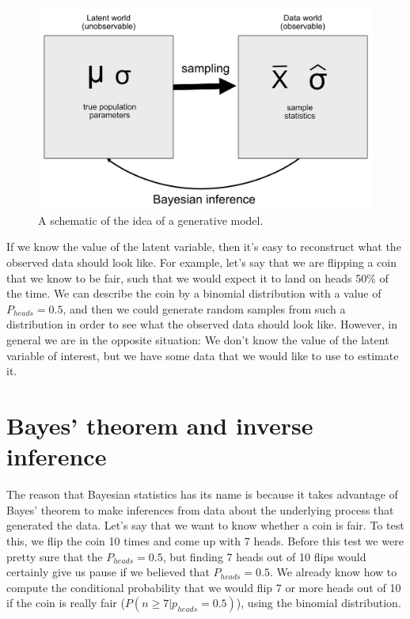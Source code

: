 \documentclass[
  12pt,
]{book}
\begin{document}
\begin{figure}
\includegraphics[width=0.8\linewidth]{images/BayesianInference} \caption{A schematic of the idea of a generative model.}\label{fig:GenerativeModel}
\end{figure}

If we know the value of the latent variable, then it's easy to reconstruct what the observed data should look like. For example, let's say that we are flipping a coin that we know to be fair, such that we would expect it to land on heads 50\% of the time. We can describe the coin by a binomial distribution with a value of \(P_{heads}=0.5\), and then we could generate random samples from such a distribution in order to see what the observed data should look like. However, in general we are in the opposite situation: We don't know the value of the latent variable of interest, but we have some data that we would like to use to estimate it.

\hypertarget{bayes-theorem-and-inverse-inference}{%
\section{Bayes' theorem and inverse inference}\label{bayes-theorem-and-inverse-inference}}

The reason that Bayesian statistics has its name is because it takes advantage of Bayes' theorem to make inferences from data about the underlying process that generated the data. Let's say that we want to know whether a coin is fair. To test this, we flip the coin 10 times and come up with 7 heads. Before this test we were pretty sure that the \(P_{heads}=0.5\), but finding 7 heads out of 10 flips would certainly give us pause if we believed that \(P_{heads}=0.5\). We already know how to compute the conditional probability that we would flip 7 or more heads out of 10 if the coin is really fair (\(P(n\ge7|p_{heads}=0.5)\)), using the binomial distribution.
\end{document}
